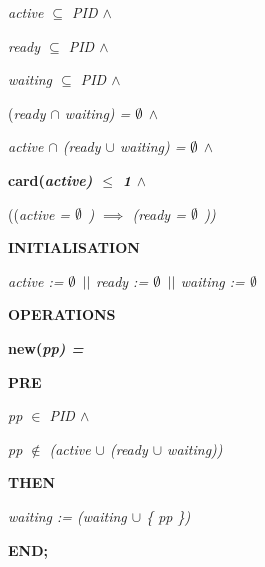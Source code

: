 \documentclass[11pt]{article}
\begin{document}
\begin{sloppypar}
\hspace*{0.40in}\it active  $\subseteq$  \it PID  $\land$ 

\hspace*{0.40in}\it ready  $\subseteq$  \it PID\hspace*{0.15in} $\land$ 

\hspace*{0.40in}\it waiting  $\subseteq$  \it PID  $\land$ 

\hspace*{0.40in}\rm (\it ready  $\cap$  \it waiting\rm ) \rm =  $\emptyset$   $\land$ 

\hspace*{0.40in}\it active  $\cap$  \rm (\it ready  $\cup$  \it waiting\rm ) \rm =  $\emptyset$   $\land$ 

\hspace*{0.40in}\bf card\rm (\it active\rm )  $\leq$  \rm 1  $\land$ 

\hspace*{0.40in}\rm (\rm (\it active \rm =  $\emptyset$ \rm )\hspace*{0.10in} $\implies$  \rm (\it ready \rm =  $\emptyset$ \rm )\rm )

\hspace*{0.70in}

\bf INITIALISATION\hspace*{0.10in}

\hspace*{0.20in}\it active \rm :=  $\emptyset$   $\mbox{$\mid\mid$}$  \it ready \rm :=  $\emptyset$   $\mbox{$\mid\mid$}$  \it waiting \rm :=  $\emptyset$ 

\bf OPERATIONS

\bf new\rm (\it pp\rm ) \rm =

\hspace*{0.20in}\bf PRE

\hspace*{0.40in}\it pp  $\in$  \it PID\hspace*{0.10in} $\land$ 

\hspace*{0.40in}\it pp  $\not\in$  \rm (\it active  $\cup$  \rm (\it ready  $\cup$  \it waiting\rm )\rm )

\hspace*{0.20in}\bf THEN

\hspace*{0.40in}\it waiting \rm := \rm (\it waiting  $\cup$  \rm \{ \it pp \rm \}\rm )

\hspace*{0.20in}\bf END\rm ;


\end{sloppypar}
\end{document}
